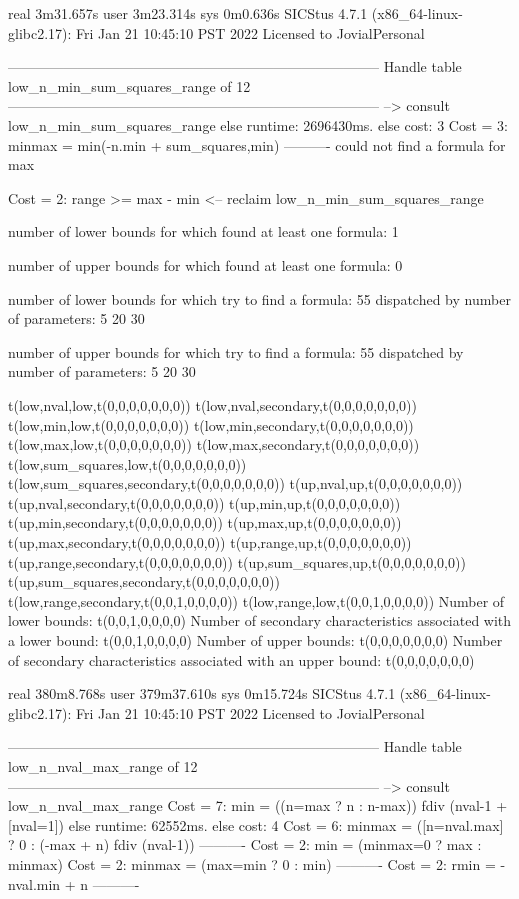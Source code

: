 real	3m31.657s
user	3m23.314s
sys	0m0.636s
SICStus 4.7.1 (x86_64-linux-glibc2.17): Fri Jan 21 10:45:10 PST 2022
Licensed to JovialPersonal


--------------------------------------------------------------------------------
Handle table low_n_min_sum_squares_range of 12
--------------------------------------------------------------------------------
--> consult low_n_min_sum_squares_range
else runtime: 2696430ms. else cost: 3
Cost =  3:  minmax = min(-n.min + sum_squares,min) %
----------
could not find a formula for max

Cost =  2:  range >= max - min
<-- reclaim low_n_min_sum_squares_range

number of lower bounds for which found at least one formula: 1

number of upper bounds for which found at least one formula: 0

number of lower bounds for which try to find a formula: 55
dispatched by number of parameters: 5  20  30

number of upper bounds for which try to find a formula: 55
dispatched by number of parameters: 5  20  30

t(low,nval,low,t(0,0,0,0,0,0,0))
t(low,nval,secondary,t(0,0,0,0,0,0,0))
t(low,min,low,t(0,0,0,0,0,0,0))
t(low,min,secondary,t(0,0,0,0,0,0,0))
t(low,max,low,t(0,0,0,0,0,0,0))
t(low,max,secondary,t(0,0,0,0,0,0,0))
t(low,sum_squares,low,t(0,0,0,0,0,0,0))
t(low,sum_squares,secondary,t(0,0,0,0,0,0,0))
t(up,nval,up,t(0,0,0,0,0,0,0))
t(up,nval,secondary,t(0,0,0,0,0,0,0))
t(up,min,up,t(0,0,0,0,0,0,0))
t(up,min,secondary,t(0,0,0,0,0,0,0))
t(up,max,up,t(0,0,0,0,0,0,0))
t(up,max,secondary,t(0,0,0,0,0,0,0))
t(up,range,up,t(0,0,0,0,0,0,0))
t(up,range,secondary,t(0,0,0,0,0,0,0))
t(up,sum_squares,up,t(0,0,0,0,0,0,0))
t(up,sum_squares,secondary,t(0,0,0,0,0,0,0))
t(low,range,secondary,t(0,0,1,0,0,0,0))
t(low,range,low,t(0,0,1,0,0,0,0))
Number of lower bounds:                                             t(0,0,1,0,0,0,0)
Number of secondary characteristics associated with a lower bound:  t(0,0,1,0,0,0,0)
Number of upper bounds:                                             t(0,0,0,0,0,0,0)
Number of secondary characteristics associated with an upper bound: t(0,0,0,0,0,0,0)

real	380m8.768s
user	379m37.610s
sys	0m15.724s
SICStus 4.7.1 (x86_64-linux-glibc2.17): Fri Jan 21 10:45:10 PST 2022
Licensed to JovialPersonal


--------------------------------------------------------------------------------
Handle table low_n_nval_max_range of 12
--------------------------------------------------------------------------------
--> consult low_n_nval_max_range
Cost =  7:  min    = ((n=max ? n : n-max)) fdiv (nval-1 + [nval=1]) %
else runtime: 62552ms. else cost: 4
Cost =  6:  minmax = ([n=nval.max] ? 0 : (-max + n) fdiv (nval-1)) %
----------
Cost =  2:  min    = (minmax=0 ? max : minmax)
Cost =  2:  minmax = (max=min ? 0 : min)
----------
Cost =  2:  rmin   = -nval.min + n
----------

